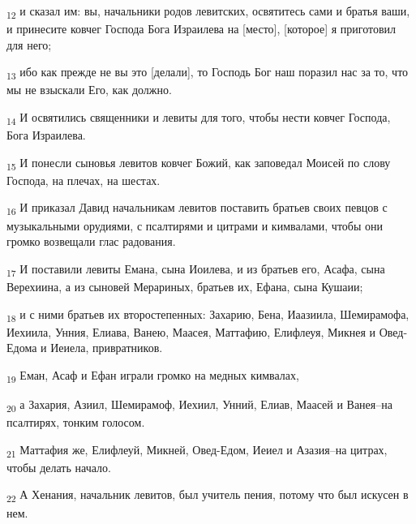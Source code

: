 \begin{tcolorbox}
\textsubscript{12} и сказал им: вы, начальники родов левитских, освятитесь сами и братья ваши, и принесите ковчег Господа Бога Израилева на [место], [которое] я приготовил для него;
\end{tcolorbox}
\begin{tcolorbox}
\textsubscript{13} ибо как прежде не вы это [делали], то Господь Бог наш поразил нас за то, что мы не взыскали Его, как должно.
\end{tcolorbox}
\begin{tcolorbox}
\textsubscript{14} И освятились священники и левиты для того, чтобы нести ковчег Господа, Бога Израилева.
\end{tcolorbox}
\begin{tcolorbox}
\textsubscript{15} И понесли сыновья левитов ковчег Божий, как заповедал Моисей по слову Господа, на плечах, на шестах.
\end{tcolorbox}
\begin{tcolorbox}
\textsubscript{16} И приказал Давид начальникам левитов поставить братьев своих певцов с музыкальными орудиями, с псалтирями и цитрами и кимвалами, чтобы они громко возвещали глас радования.
\end{tcolorbox}
\begin{tcolorbox}
\textsubscript{17} И поставили левиты Емана, сына Иоилева, и из братьев его, Асафа, сына Верехиина, а из сыновей Мерариных, братьев их, Ефана, сына Кушаии;
\end{tcolorbox}
\begin{tcolorbox}
\textsubscript{18} и с ними братьев их второстепенных: Захарию, Бена, Иаазиила, Шемирамофа, Иехиила, Унния, Елиава, Ванею, Маасея, Маттафию, Елифлеуя, Микнея и Овед-Едома и Иеиела, привратников.
\end{tcolorbox}
\begin{tcolorbox}
\textsubscript{19} Еман, Асаф и Ефан играли громко на медных кимвалах,
\end{tcolorbox}
\begin{tcolorbox}
\textsubscript{20} а Захария, Азиил, Шемирамоф, Иехиил, Унний, Елиав, Маасей и Ванея--на псалтирях, тонким голосом.
\end{tcolorbox}
\begin{tcolorbox}
\textsubscript{21} Маттафия же, Елифлеуй, Микней, Овед-Едом, Иеиел и Азазия--на цитрах, чтобы делать начало.
\end{tcolorbox}
\begin{tcolorbox}
\textsubscript{22} А Хенания, начальник левитов, был учитель пения, потому что был искусен в нем.
\end{tcolorbox}
